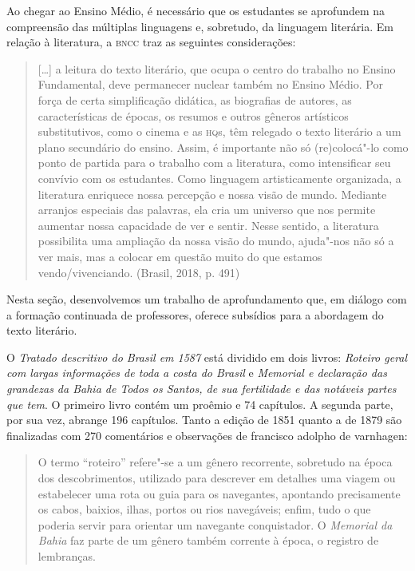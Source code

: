 \documentclass[12pt]{extarticle}
\begin{document}
Ao chegar ao Ensino Médio, é necessário que os estudantes se aprofundem
na compreensão das múltiplas linguagens e, sobretudo, da linguagem
literária. Em relação à literatura, a \textsc{bncc} traz as seguintes
considerações:

\begin{quote}
{[}\ldots{}{]} a leitura do texto literário, que ocupa o centro do trabalho
no Ensino Fundamental, deve permanecer nuclear também no Ensino Médio.
Por força de certa simplificação didática, as biografias de autores, as
características de épocas, os resumos e outros gêneros artísticos
substitutivos, como o cinema e as \textsc{hq}s, têm relegado o texto literário a
um plano secundário do ensino. Assim, é importante não só (re)colocá"-lo
como ponto de partida para o trabalho com a literatura, como
intensificar seu convívio com os estudantes. Como linguagem
artisticamente organizada, a literatura enriquece nossa percepção e
nossa visão de mundo. Mediante arranjos especiais das palavras, ela cria
um universo que nos permite aumentar nossa capacidade de ver e sentir.
Nesse sentido, a literatura possibilita uma ampliação da nossa visão do
mundo, ajuda"-nos não só a ver mais, mas a colocar em questão muito do
que estamos vendo/vivenciando. (Brasil, 2018, p. 491)
\end{quote}

Nesta seção, desenvolvemos um trabalho de aprofundamento que, em diálogo
com a formação continuada de professores, oferece subsídios para a
abordagem do texto literário.

O \textit{Tratado descritivo do Brasil em 1587} está dividido em dois livros:
\textit{Roteiro geral com largas informações de toda a costa do Brasil} e
\textit{Memorial e declaração das grandezas da Bahia de Todos os Santos, de sua
fertilidade e das notáveis partes que tem}. O primeiro livro contém um
proêmio e 74 capítulos. A segunda parte, por sua vez, abrange 196
capítulos. Tanto a edição de 1851 quanto a de 1879 são finalizadas com
270 comentários e observações de francisco adolpho de varnhagen:


\begin{quote}
O termo ``roteiro'' refere"-se a um gênero recorrente, sobretudo na época
dos descobrimentos, utilizado para descrever em detalhes uma viagem ou
estabelecer uma rota ou guia para os navegantes, apontando precisamente
os cabos, baixios, ilhas, portos ou rios navegáveis; enfim, tudo o que
poderia servir para orientar um navegante conquistador. O \textit{Memorial da
Bahia} faz parte de um gênero também corrente à época, o registro de
lembranças.
\end{quote}
\end{document}
